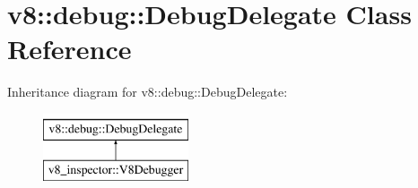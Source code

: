\hypertarget{classv8_1_1debug_1_1DebugDelegate}{}\section{v8\+:\+:debug\+:\+:Debug\+Delegate Class Reference}
\label{classv8_1_1debug_1_1DebugDelegate}
Inheritance diagram for v8\+:\+:debug\+:\+:Debug\+Delegate\+:\begin{figure}[H]
\begin{center}
\leavevmode
\includegraphics[height=2.000000cm]{classv8_1_1debug_1_1DebugDelegate}
\end{center}
\end{figure}
